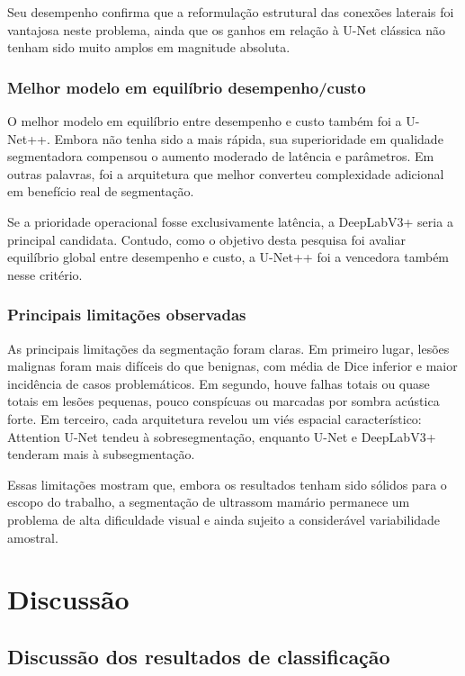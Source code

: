 \documentclass[tcc,capa]{texufpel}
\begin{document}
Seu desempenho confirma que a reformulação estrutural das conexões laterais foi vantajosa neste problema, ainda que os ganhos em relação à U-Net clássica não tenham sido muito amplos em magnitude absoluta.

\subsection{Melhor modelo em equilíbrio desempenho/custo}

O melhor modelo em equilíbrio entre desempenho e custo também foi a U-Net++. Embora não tenha sido a mais rápida, sua superioridade em qualidade segmentadora compensou o aumento moderado de latência e parâmetros. Em outras palavras, foi a arquitetura que melhor converteu complexidade adicional em benefício real de segmentação.

Se a prioridade operacional fosse exclusivamente latência, a DeepLabV3+ seria a principal candidata. Contudo, como o objetivo desta pesquisa foi avaliar equilíbrio global entre desempenho e custo, a U-Net++ foi a vencedora também nesse critério.

\subsection{Principais limitações observadas}

As principais limitações da segmentação foram claras. Em primeiro lugar, lesões malignas foram mais difíceis do que benignas, com média de Dice inferior e maior incidência de casos problemáticos. Em segundo, houve falhas totais ou quase totais em lesões pequenas, pouco conspícuas ou marcadas por sombra acústica forte. Em terceiro, cada arquitetura revelou um viés espacial característico: Attention U-Net tendeu à sobresegmentação, enquanto U-Net e DeepLabV3+ tenderam mais à subsegmentação.

Essas limitações mostram que, embora os resultados tenham sido sólidos para o escopo do trabalho, a segmentação de ultrassom mamário permanece um problema de alta dificuldade visual e ainda sujeito a considerável variabilidade amostral.

\chapter{Discussão}

\section{Discussão dos resultados de classificação}
\end{document}
